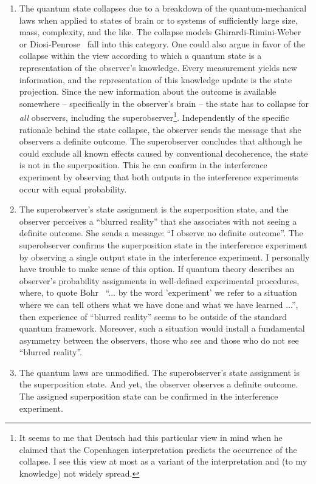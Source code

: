 \documentclass[12pt,a4]{article}
\begin{document}
\begin{enumerate}

\item The quantum state collapses due to a breakdown of the quantum-mechanical laws when applied to states of brain or to systems of sufficiently large size, mass, complexity, and the like. The collapse models Ghirardi-Rimini-Weber~\cite{GRW} or Diosi-Penrose~\cite{diosi,penrose} fall into this category. One could also argue in favor of the collapse within the view according to which a quantum state is a representation of the observer's knowledge. Every measurement yields new information, and the representation of this knowledge update is the state projection. Since the new information about the outcome is available somewhere -- specifically in the observer's brain -- the state has to collapse for {\it all} observers, including the superobserver\footnote{It seems to me that Deutsch had this particular view in mind when he claimed that the Copenhagen interpretation predicts the occurrence of the collapse. I see this view at most as a variant of the interpretation and (to my knowledge) not widely spread.}. Independently of the specific rationale behind the state collapse, the observer sends the message that she observers a definite outcome. The superobserver concludes that although he could exclude all known effects caused by conventional decoherence, the state is not in the superposition. This he can confirm in the interference experiment by observing that both outputs in the interference experiments occur with equal probability.  

\item The superobserver's state assignment is the superposition state, and the observer perceives a ``blurred reality'' that she associates with not seeing a definite outcome. She sends a message: ``I observe no definite outcome''. The superobserver confirms the superposition state in the interference experiment by observing a single output state in the interference experiment. I personally have trouble to make sense of this option. If quantum theory describes an  observer's probability assignments in well-defined experimental procedures, where, to quote Bohr~\cite{bohr2} ``... by the word 'experiment' we refer to a situation where we can tell others what we have done and what we have learned ...'', then experience of ``blurred reality'' seems to be outside of the standard quantum framework. Moreover, such a situation would install a fundamental asymmetry between the observers, those who see and those who do not see ``blurred reality''.

\item The quantum laws are unmodified. The superobserver's state assignment is the superposition state. And yet, the observer observes a definite outcome. The assigned superposition state can be confirmed in the interference experiment. 

\end{enumerate}
\end{document}
